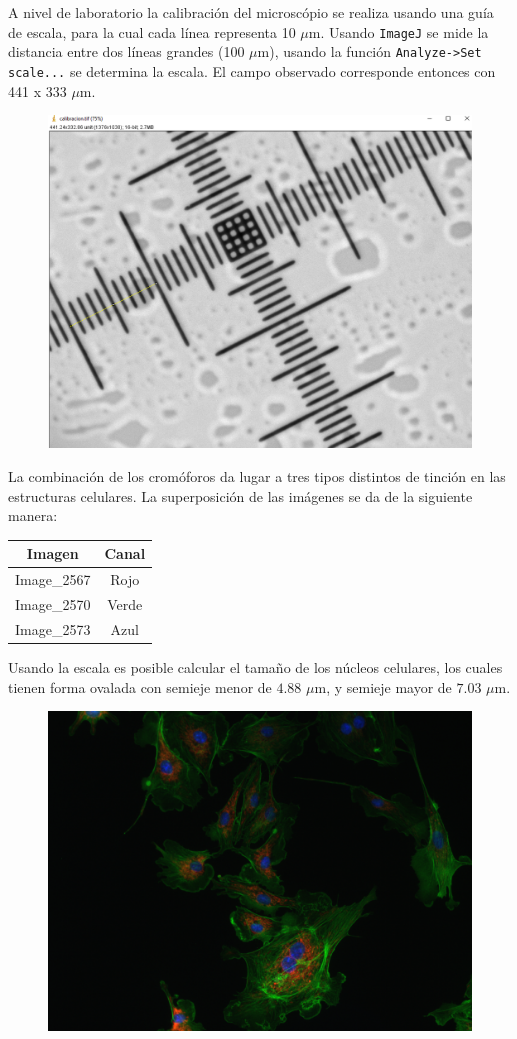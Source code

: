 \documentclass[addpoints,12pt]{exam}
\begin{document}
	A nivel de laboratorio la calibración del microscópio se realiza usando una guía de escala, para la cual cada línea representa 10 $\mu$m. Usando \texttt{ImageJ} se mide la distancia entre dos líneas grandes (100 $\mu$m), usando la función \texttt{Analyze->Set scale...} se determina la escala. El campo observado corresponde entonces con 441 x 333 $\mu$m.
	\begin{figure}[h]
		\centering
		\includegraphics[width=0.7\linewidth]{calibracion.png}
	\end{figure}

	La combinación de los cromóforos da lugar a tres tipos distintos de tinción en las estructuras celulares. La superposición de las imágenes se da de la siguiente manera:
	\begin{table}[!h]
		\centering
		\begin{tabular}{cc}
			\hline
			\textbf{Imagen} & \textbf{Canal} \\
			\hline
			Image\_2567 & Rojo \\
			Image\_2570 & Verde \\
			Image\_2573 & Azul \\
			\hline
		\end{tabular}
	\end{table}

	Usando la escala es posible calcular el tamaño de los núcleos celulares, los cuales tienen forma ovalada con semieje menor de $4.88$ $\mu$m, y semieje mayor de $7.03$ $\mu$m.
	\begin{figure}[!h]
		\centering
		\includegraphics[width=0.7\linewidth]{composite.png}
	\end{figure}
\end{document}

